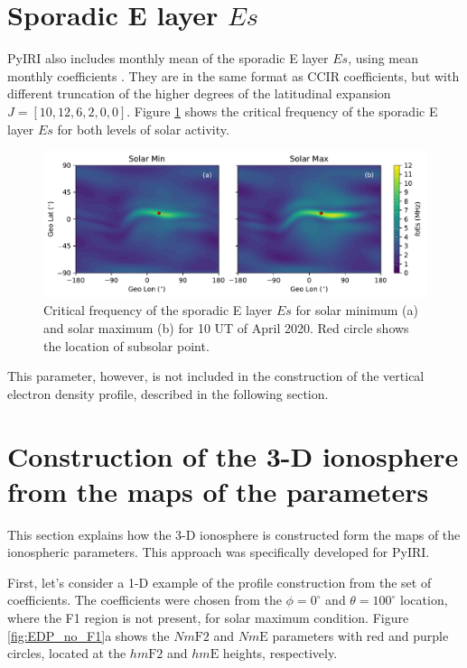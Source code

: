 \documentclass[draft]{agujournal2019}
\begin{document}
\section{Sporadic E layer $Es$}
PyIRI also includes monthly mean of the sporadic E layer $Es$, using mean monthly coefficients \cite{Bra03}. They are in the same format as CCIR coefficients, but with different truncation of the higher degrees of the latitudinal expansion $J=[10, 12, 6, 2, 0, 0]$. Figure \ref{fig:Es_min_max} shows the critical frequency of the sporadic E layer $Es$ for both levels of solar activity. 
\begin{figure}[H]
  \includegraphics[scale=0.7]{PyIRI_foEs_min_max.pdf}
  \caption{Critical frequency of the sporadic E layer $Es$ for solar minimum (a) and solar maximum (b) for 10 UT of April 2020. Red circle shows the location of subsolar point.}
  \label{fig:Es_min_max}
\end{figure}
This parameter, however, is not included in the construction of the vertical electron density profile, described in the following section. 

\section{Construction of the 3-D ionosphere from the maps of the parameters}
This section explains how the 3-D ionosphere is constructed form the maps of the ionospheric parameters. This approach was specifically developed for PyIRI. 

First, let's consider a 1-D example of the profile construction from the set of coefficients. 
The coefficients were chosen from the $\phi=0^{\circ}$ and $\theta=100^{\circ}$ location, where the F1 region is not present, for solar maximum condition. Figure \ref{fig:EDP_no_F1}a shows the $Nm\mathrm{F2}$ and $Nm\mathrm{E}$ parameters with red and purple circles, located at the $hm\mathrm{F2}$ and $hm\mathrm{E}$ heights, respectively. 
\end{document}
